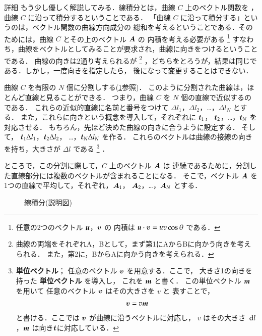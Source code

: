     \begin{memo}{詳細}
        もう少し優しく解説してみる．線積分とは，曲線 $C$ 上のベクトル関数を
        ，曲線 $C$ に沿って積分するということである．
        「曲線 $C$ に沿って積分する」というのは，ベクトル関数の曲線方向成分の
        総和を考えるということである．そのためには，曲線 $C$ とその上のベクトル $\boldsymbol{A}$ の
        内積を考える必要がある
        \footnote{
        任意の2つのベクトル $\textit{\textbf{u}}$，$\boldsymbol{v}$ の
        内積は $\textit{\textbf{u}}\cdot\boldsymbol{v}=uv\cos\theta$ である．
        }
        すなわち，曲線をベクトルとしてみることが要求され，曲線に向きをつけるということである．
        曲線の向きは2通り考えられるが
        \footnote{
        曲線の両端をそれぞれA，Bとして，まず第1にAからBに向かう向きを考えられる．
        また，第2に，BからAに向かう向きを考えられる．
        }
        ，どちらをとろうが，結果は同じである．しかし，一度向きを指定したら，
        後になって変更することはできない．

        曲線 $C$ を有限の $N$ 個に分割しする(\ref{fig:senseki2}参照)．
        このように分割された曲線は，ほとんど直線と見ることができる．
        つまり，曲線 $C$ を $N$ 個の直線で近似するのである．
        これらの近似的直線に名前と番号をつけて $\Delta l_{1}$，$\Delta l_{2}$，…，$\Delta l_{N}$ とする．
        また，これらに向きという概念を導入して，それぞれに $\boldsymbol{t}_{1}$，
        $\boldsymbol{t}_{2}$，…，$\boldsymbol{t}_{N}$ を対応させる．
        もちろん，先ほど決めた曲線の向きに合うように設定する．
        そして，
        $\boldsymbol{t}_{1}\Delta l_{1}$，$\boldsymbol{t}_{2}\Delta l_{2}$，
        …，$\boldsymbol{t}_{N}\Delta l_{N}$ を作る．
        これらのベクトルは曲線の接線の向きを持ち，大きさが $\Delta l$ である
        \footnote{
        \textbf{単位ベクトル}；
        任意のベクトル $\boldsymbol{v}$ を用意する．ここで，
        大きさ1の向きを持った \textbf{単位ベクトル} を導入し，
        これを $\textit{\textbf{m}}$ と書く．
        この単位ベクトル $\textit{\textbf{m}}$ を用いて
        任意のベクトル $\boldsymbol{v}$ はその大きさを $v$ と
        表すことで，
        \begin{align}
         \boldsymbol{v}=v\textit{\textbf{m}}
        \end{align}
        と書ける．ここでは $\boldsymbol{v}$ が曲線に沿うベクトルに対応し，
        $v$ はその大きさ $\,\mathrm{d} l$，$\textit{\textbf{m}}$ は向き$\boldsymbol{t}$に対応している．
        }
        ．

        ところで，この分割に際して，$C$ 上のベクトル $\boldsymbol{A}$ は
        連続であるために，分割した直線部分には複数のベクトルが含まれることになる．
        そこで，ベクトル $\boldsymbol{A}$ を
        1つの直線で平均して，それぞれ，$\boldsymbol{A}_{1}$，
        $\boldsymbol{A}_{2}$，…，$\boldsymbol{A}_{N}$ とする．
                    \begin{figure}[hbt]
                        \begin{center}
                            \caption{線積分(説明図)}
                            \label{fig:senseki2}
                        \end{center}
                    \end{figure}


\end{memo}
